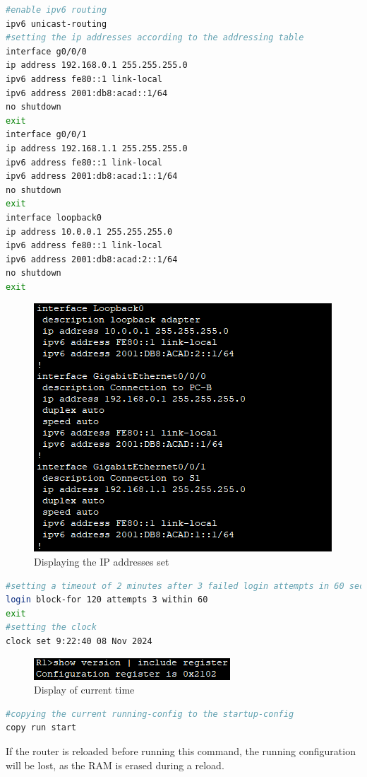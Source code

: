 \documentclass[a4paper]{article}
\newcommand{\abc}{\hfill \break}
\begin{document}
\begin{lstlisting}[language=bash,
	keywordstyle=\color{black},
	rulecolor=\color{blue}]
#enable ipv6 routing
ipv6 unicast-routing
#setting the ip addresses according to the addressing table
interface g0/0/0
ip address 192.168.0.1 255.255.255.0
ipv6 address fe80::1 link-local
ipv6 address 2001:db8:acad::1/64
no shutdown
exit
interface g0/0/1
ip address 192.168.1.1 255.255.255.0
ipv6 address fe80::1 link-local
ipv6 address 2001:db8:acad:1::1/64
no shutdown
exit
interface loopback0
ip address 10.0.0.1 255.255.255.0
ipv6 address fe80::1 link-local
ipv6 address 2001:db8:acad:2::1/64
no shutdown
exit
\end{lstlisting}
\newpage
\begin{figure}[h]
	\includegraphics[scale=0.55]{images/showip.png}
	\centering
	\caption{Displaying the IP addresses set}
\end{figure}
\begin{lstlisting}[language=bash,
	keywordstyle=\color{black},
	rulecolor=\color{blue}]
#setting a timeout of 2 minutes after 3 failed login attempts in 60 seconds
login block-for 120 attempts 3 within 60
exit
#setting the clock
clock set 9:22:40 08 Nov 2024
\end{lstlisting}
\begin{figure}[h]
	\includegraphics[scale=0.55]{images/showclock.png}
	\centering
	\caption{Display of current time}
\end{figure}\abc

\begin{lstlisting}[language=bash,
	keywordstyle=\color{black},
	rulecolor=\color{blue}]
#copying the current running-config to the startup-config
copy run start
\end{lstlisting}
If the router is reloaded before running this command, the running configuration will be lost, as the RAM is erased during a reload.
\end{document}
